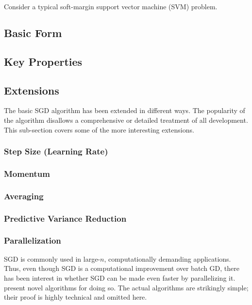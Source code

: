 \documentclass{article}
\begin{document}
Consider a typical soft-margin support vector machine (SVM) problem.

\subsection{Basic Form}

\cite{bottou2010large}
\cite{bottou2012stochastic}
\cite{boyd2004convex}
\cite{dal2015calibrating}

\subsection{Key Properties}

\subsection{Extensions}

The basic SGD algorithm has been extended in different ways. The popularity of
the algorithm disallows a comprehensive or detailed treatment of all
development. This sub-section covers some of the more interesting extensions.

\subsubsection{Step Size (Learning Rate)}

\cite{shalev2011pegasos}

\subsubsection{Momentum}

\cite{polyak1992acceleration}
\cite{nesterov}

\subsubsection{Averaging}

\subsubsection{Predictive Variance Reduction}

\subsubsection{Parallelization}

SGD is commonly used in large-$n$, computationally demanding applications. Thus,
even though SGD is a computational improvement over batch GD, there has been
interest in whether SGD can be made even faster by parallelizing it.
\cite{zinkevich2010parallelized} present novel algorithms for doing so. The
actual algorithms are strikingly simple; their proof is highly technical and
omitted here.
\end{document}
